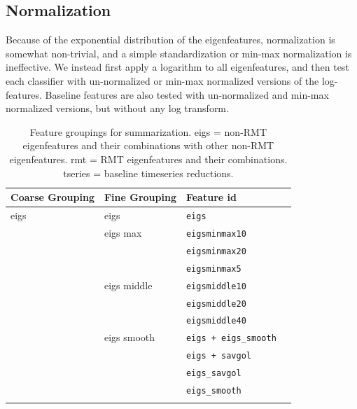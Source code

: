 \documentclass[12pt]{spieman}  %
\newcommand{\tcode}[1]{\footnotesize \texttt{#1} \normalsize}
\begin{document}
\begin{spacing}{2}
\subsection{Normalization}

Because of the exponential distribution of the eigenfeatures, normalization is
somewhat non-trivial, and a simple standardization or min-max normalization is
ineffective. We instead first apply a logarithm to all eigenfeatures, and then
test each classifier with un-normalized or min-max normalized versions of the
log-features. Baseline features are also tested with un-normalized and min-max
normalized versions, but without any log transform.


\begin{table}[h!]
\caption{
    Feature groupings for summarization. eigs = non-RMT eigenfeatures and their combinations with
    other non-RMT eigenfeatures. rmt = RMT eigenfeatures and their combinations. tseries = baseline
    timeseries reductions.\\
}
\label{tab:features}
\small
\centering
\begin{tabular}{lllr}
\hline
\textbf{Coarse Grouping} & \textbf{Fine Grouping} & \textbf{Feature id}   \\
\hline
eigs           & eigs          & \tcode{eigs}                           \\
               & eigs max      & \tcode{eigsminmax10}                   \\
               &               & \tcode{eigsminmax20}                   \\
               &               & \tcode{eigsminmax5}                    \\
               & eigs middle   & \tcode{eigsmiddle10}                   \\
               &               & \tcode{eigsmiddle20}                   \\
               &               & \tcode{eigsmiddle40}                   \\
               & eigs smooth   & \tcode{eigs + eigs\_smooth}            \\
               &               & \tcode{eigs + savgol}                  \\
               &               & \tcode{eigs\_savgol}                   \\
               &               & \tcode{eigs\_smooth}                   \\
               &               &                                        \\

\end{tabular}
\end{table}
\end{spacing}
\end{document}
